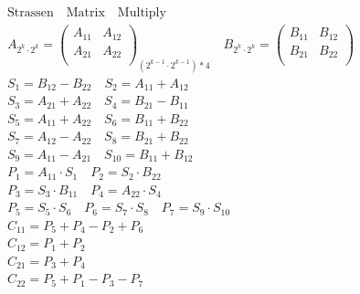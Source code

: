 \documentclass{article}
\begin{document}
\begin{align*}
    \mathrm{Strassen \quad Matrix \quad Multiply} \\
    A_{2^{k} \cdot 2^{k}} = \left(
        \begin{array}{cc}
            A_{11} & A_{12} \\ 
            A_{21} & A_{22} \\
        \end{array} 
    \right)_{(2^{k-1} \cdot 2^{k-1}) * 4} \quad B_{2^{k} \cdot 2^{k}} = \left(
        \begin{array}{cc}
            B_{11} & B_{12} \\ 
            B_{21} & B_{22} \\
        \end{array} 
    \right)\\
    S_1 = B_{12} - B_{22} \quad 
    S_2 = A_{11} + A_{12}\\
    S_3 = A_{21} + A_{22} \quad 
    S_4 = B_{21} - B_{11}\\
    S_5 = A_{11} + A_{22}\quad 
    S_6 = B_{11} + B_{22}\\
    S_7 = A_{12} - A_{22}\quad 
    S_8 = B_{21} + B_{22}\\
    S_9 = A_{11} - A_{21}\quad 
    S_{10} = B_{11} + B_{12} \\
    P_1 = A_{11} \cdot S_{1} \quad 
    P_2 = S_{2} \cdot B_{22} \\
    P_3 = S_{3} \cdot B_{11} \quad 
    P_4 = A_{22} \cdot S_{4} \\
    P_5 = S_{5} \cdot S_{6} \quad 
    P_6 = S_{7} \cdot S_{8} \quad 
    P_7 = S_{9} \cdot S_{10}\\
    C_{11} = P_5 + P_4 - P_2 + P_6\\C_{12} = P_1 + P_2\\C_{21} = P_3 + P_4\\C_{22} = P_5 + P_1 - P_3 - P_7
\end{align*}


\clearpage
\end{document}
